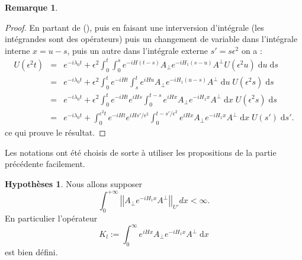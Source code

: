\documentclass[12pt,openany,a4paper, titlepage]{article}
\newcommand{\lb}{\left|}
\newcommand{\rb}{\right|}
\newcommand{\dd}{\;\mathrm{d}}
\newcommand{\St}[2]{e^{-i #1 #2}}
\newcommand{\Stt}[2]{e^{i #1 #2}}
\theoremstyle{definition}
\newtheorem{ass}{Hypothèses}
\theoremstyle{definition}
\theoremstyle{definition}
\theoremstyle{definition}
\theoremstyle{definition}
\newtheorem{rem}{Remarque}
\theoremstyle{definition}
\begin{document}
\begin{rem}
\begin{proof}
En partant de (), puis en faisant une interversion d'intégrale (les intégrandes sont des opérateurs) puis un changement de variable dans l'intégrale interne $x = u -s$, puis un autre dans l'intégrale externe $s' = s\epsilon^2$ on a :
\begin{eqnarray}
    U(\epsilon^2t) &=&  \St{\lambda_0}{t} + \epsilon^2\int_0^t\int_0^s \St{H}{(t-s)}A_\perp \St{H_1}{(s-u)}A^\perp U(\epsilon^2u) \dd u \dd s \\
                   &=&  \St{\lambda_0}{t} + \epsilon^2\int_0^t\St{H}{t}\int_s^t \Stt{H}{u}A_\perp \St{H_1}{(u-s)}A^\perp \dd u \;U(\epsilon^2s) \dd s \\
                   &=&  \St{\lambda_0}{t} + \epsilon^2\int_0^t\St{H}{t}\Stt{H}{s}\int_0^{t-s} \Stt{H}{x}A_\perp \St{H_1}{x}A^\perp \dd x \; U(\epsilon^2s) \dd s \\
                   &=&  \St{\lambda_0}{t} + \int_0^{\epsilon^2t}\St{H}{t}\Stt{H}{s'/\epsilon^2}\int_0^{t-s'/\epsilon^2} \Stt{H}{x}A_\perp \St{H_1}{x}A^\perp \dd x \; U(s') \dd s'.
\end{eqnarray}
ce qui prouve le résultat.
\end{proof}

Les notations ont été choisis de sorte à utiliser les propositions de la partie précédente facilement.

\begin{ass}
Nous allons supposer 
\begin{equation}
    \int_0^{+\infty} \lb\lb A_\perp \St{H_1}{x}A^\perp \rb\rb_{U'} dx < \infty.
\end{equation}
En particulier l'opérateur 
\begin{equation}
    K_l := \int_0^{\infty} \Stt{H}{x}A_\perp \St{H_1}{x}A^\perp \dd x
\end{equation}
est bien défini.
\end{ass}


\end{rem}
\end{document}
